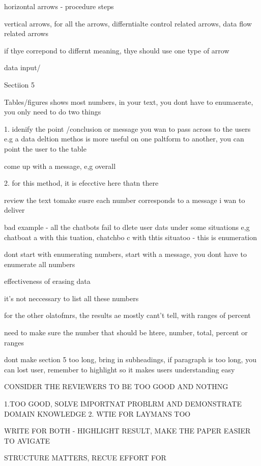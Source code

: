 horizontal arrows - procedure steps

vertical arrows, for all the arrows, differntialte control related arrows, data flow related arrows

if thye correpond to differnt meaning, thye should use one type of arrow


data input/



Sectiion 5

Tables/figures shows most numbers, in your text, you dont have to enumaerate, you only need to do two things

1. idenify the point /conclusion or message you wan to pass across to the users e.g a data deltion methos is more useful on one paltform to another, you can point the user to the table

come up with a message, e,g overall

2. for this method, it is efecctive here thatn there

review the text tomake susre each number corresponds to a message i wan to deliver


bad example - all the chatbots fail to dlete user dats under some situations e,g chatboat a with this tuation, chatchbo c with thtis situatoo -  this is enumeration

dont start with enumerating numbers, start with a message, you dont have to enumerate all numbers


effectiveness of erasing data


it's not neccessary to list all these numbers

for the other olatofmrs, the results ae mostly cant't tell, with ranges of percent


need to make sure the number that should be htere, number, total, percent or ranges




dont make section 5 too long, bring in subheadings, if paragraph is too long, you can lost user, remember to highlight so it makes users understanding easy



CONSIDER THE REVIEWERS TO BE TOO GOOD AND NOTHNG

1.TOO GOOD, SOLVE IMPORTNAT PROBLRM AND DEMONSTRATE DOMAIN KNOWLEDGE
2. WTIE FOR LAYMANS TOO


WRITE FOR BOTH - HIGHLIGHT RESULT, MAKE THE PAPER EASIER TO AVIGATE

STRUCTURE MATTERS,
RECUE EFFORT FOR


